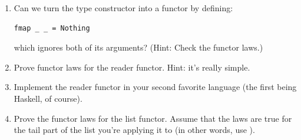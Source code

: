 \begin{enumerate}
  \tightlist
\item
  Can we turn the  type constructor into a functor by
  defining:

\begin{Verbatim}[commandchars=\\\{\}]
fmap _ _ = Nothing
\end{Verbatim}

  which ignores both of its arguments? (Hint: Check the functor laws.)
\item
  Prove functor laws for the reader functor. Hint: it's really simple.
\item
  Implement the reader functor in your second favorite language (the
  first being Haskell, of course).
\item
  Prove the functor laws for the list functor. Assume that the laws are
  true for the tail part of the list you're applying it to (in other
  words, use ).
\end{enumerate}